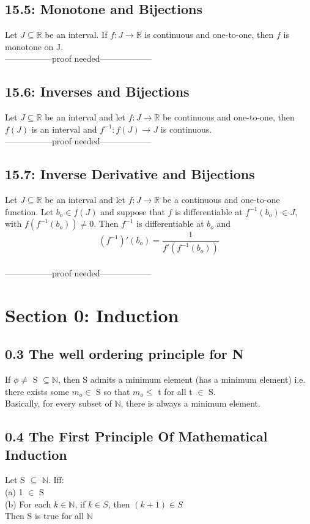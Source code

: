 \documentclass[10pt,letter]{report}
\begin{document}
\section*{15.5: Monotone and Bijections}
Let $J\subseteq\mathbb{R}$ be an interval. If $f:J\rightarrow\mathbb{R}$ is continuous and one-to-one, then $f$ is monotone on J. \\ 
-----------------proof needed------------------

\section*{15.6: Inverses and Bijections}
Let $J\subseteq\mathbb{R}$ be an interval and let $f:J\rightarrow\mathbb{R}$ be continuous and one-to-one, then $f(J)$ is an interval and $f^{-1}:f(J)\rightarrow J$ is continuous. \\ 
-----------------proof needed------------------

\section*{15.7: Inverse Derivative and Bijections}
Let $J\subseteq\mathbb{R}$ be an interval and let $f:J\rightarrow\mathbb{R}$ be a continuous and one-to-one function. Let $b_o\in f(J)$ and suppose that $f$ is differentiable at $f^{-1}(b_o)\in J$, with $f(f^{-1}(b_o))\neq0$. Then $f^{-1}$ is differentiable at $b_o$ and $$(f^{-1})'(b_o)=\frac{1}{f'(f^{-1}(b_o))}$$\\ 
-----------------proof needed------------------


\chapter*{Section 0: Induction}

\section*{0.3 The well ordering principle for N}
If $\phi\neq$ S $\subseteq \mathbb{N}$, then S admits a minimum element (has a minimum element)
i.e. there exists some $m_o \in$ S so that $m_o \leq$ t for all t $\in$ S. \\ 
Basically, for every subset of $\mathbb{N}$, there is always a minimum element. 

\section*{0.4 The First Principle Of Mathematical Induction}
Let S $\subseteq$ $\mathbb{N}$. Iff:\\
(a) 1 $\in$ S\\
(b) For each $k \in \mathbb{N}$, if $k \in S$, then $(k+1) \in S$ \\
Then S is true for all $\mathbb{N}$
\end{document}
